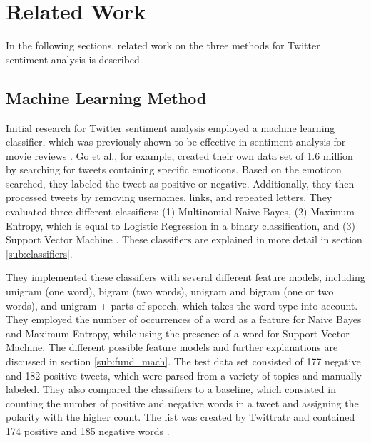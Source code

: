 \chapter{Related Work}
\label{cha:Chapter2_RelatedWork}

In the following sections, related work on the three methods for Twitter sentiment analysis is described.
\iffalse

Length: 1-2 pages

Effort: ~2 weeks

2-3 Arbeiten maximal, die genauer betrachtet werden
Ruhig mehr Zitate --> aber nicht detailliert betrachten
Introduction to Data Mining --> zu generell, nur als Zitat
Hier nur im engsten Sinne


Content
\begin{itemize}
\item Alec Go, Richa Bhayani, and Lei Huang. 2009. Twitter Sentiment Classification Using Distant Supeusedrvision.
Technical Report. Standford.
\item Taboada or Serendio or Vader?
\item Khuc et al.
\end{itemize}

\fi

\section{Machine Learning Method}
\label{sub:related_ml}
Initial research for Twitter sentiment analysis employed a machine learning classifier, which was previously shown to be effective in sentiment analysis for movie reviews \cite{GoBHaHua2009}. Go et al., for example, created their own data set of 1.6 million by searching for tweets containing specific emoticons. Based on the emoticon searched, they labeled the tweet as positive or negative. Additionally, they then processed tweets by removing usernames, links, and repeated letters. They evaluated three different classifiers: (1) Multinomial Naive Bayes, (2) Maximum Entropy, which is equal to Logistic Regression in a binary classification, and (3) Support Vector Machine \cite{GoBHaHua2009}. These classifiers are explained in more detail in section \ref{sub:classifiers}.

They implemented these classifiers with several different feature models, including unigram (one word), bigram (two words), unigram and bigram (one or two words), and unigram + parts of speech, which takes the word type into account. They employed the number of occurrences of a word as a feature for Naive Bayes and Maximum Entropy, while using the presence of a word for Support Vector Machine. The different possible feature models and further explanations are discussed in section \ref{sub:fund_mach}. The test data set consisted of 177 negative and 182 positive tweets, which were parsed from a variety of topics and manually labeled. They also compared the classifiers to a baseline, which consisted in counting the number of positive and negative words in a tweet and assigning the polarity with the higher count. The list was created by Twittratr and contained 174 positive and 185 negative words \cite{GoBHaHua2009}. 

